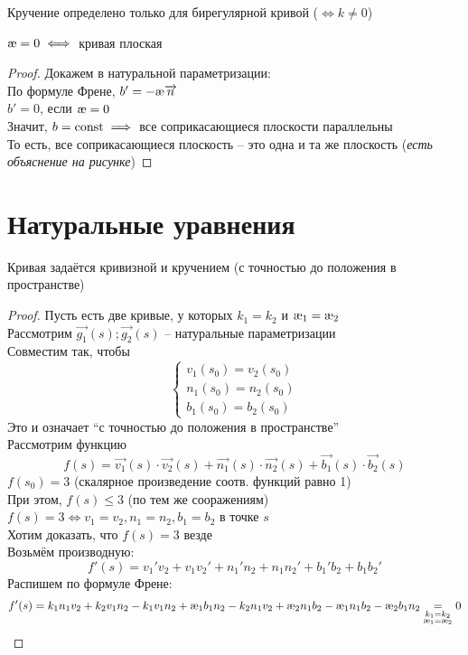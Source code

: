 \begin{remark}
	Кручение определено только для бирегулярной кривой ($ \iff k \ne 0 $)
\end{remark}

\begin{theorem}
	$ \text\ae = 0 \iff $ кривая плоская
\end{theorem}

\begin{proof}
	Докажем в натуральной параметризации: \\
	По формуле Френе, $ b' = -\text\ae \vec{n} $ \\
	$ b' = 0 $, если $ \text\ae = 0 $ \\
	Значит, $ b = \operatorname{const} \implies $ все соприкасающиеся плоскости параллельны \\
	То есть, все соприкасающиеся плоскость -- это одна и та же плоскость (\textit{есть объяснение на рисунке})
\end{proof}

\section{Натуральные уравнения}

\begin{theorem}
	Кривая задаётся кривизной и кручением (с точностью до положения в пространстве)
\end{theorem}

\begin{proof}
	Пусть есть две кривые, у которых $ k_1 = k_2 $ и $ \text\ae_1 = \text\ae_2 $ \\
	Рассмотрим $ \vec{g_1}(s); \vec{g_2}(s) $ -- натуральные параметризации \\
	Совместим так, чтобы
	$$
	\begin{cases}
		v_1(s_0) = v_2(s_0) \\
		n_1(s_0) = n_2(s_0) \\
		b_1(s_0) = b_2(s_0)
	\end{cases} $$
	Это и означает ``с точностью до положения в пространстве'' \\
	Рассмотрим функцию
	$$ f(s) = \vec{v_1}(s) \cdot \vec{v_2}(s) + \vec{n_1}(s) \cdot \vec{n_2}(s) + \vec{b_1}(s) \cdot \vec{b_2}(s) $$
	$ f(s_0) = 3 $ (скалярное произведение соотв. функций равно 1) \\
	При этом, $ f(s) \le 3 $ (по тем же сооражениям) \\
	$ f(s) = 3 \iff v_1 = v_2, n_1 = n_2, b_1 = b_2 $ в точке $ s $ \\
	Хотим доказать, что $ f(s) = 3 $ везде \\
	Возьмём производную:
	$$ f'(s) = v_1'v_2 + v_1v_2' + n_1'n_2 + n_1n_2' + b_1'b_2 + b_1b_2' $$
	Распишем по формуле Френе:
	$$ f'(s) = k_1n_1v_2 + k_2v_1n_2 - k_1v_1n_2 + \text\ae_1b_1n_2 - k_2n_1v_2 + \text\ae_2n_1b_2 - \text\ae_1n_1b_2 - \text\ae_2b_1n_2 \underset{
		\begin{subarray}{c}
			k_1 = k_2 \\
			\text\ae_1 = \text\ae_2
		\end{subarray}}= 0 $$
\end{proof}
